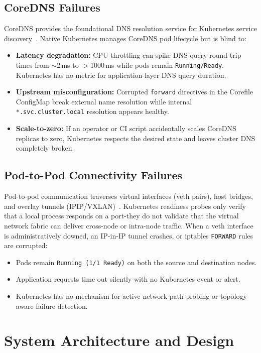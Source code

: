 \documentclass[conference]{IEEEtran}
\begin{document}
\subsection{CoreDNS Failures}
CoreDNS provides the foundational DNS resolution service for Kubernetes service discovery~\cite{coredns-docs}. Native Kubernetes manages CoreDNS pod lifecycle but is blind to:
\begin{itemize}
  \item \textbf{Latency degradation:} CPU throttling can spike DNS query round-trip times from $\sim$2\,ms to $>$1000\,ms while pods remain \texttt{Running/Ready}. Kubernetes has no metric for application-layer DNS query duration.
  \item \textbf{Upstream misconfiguration:} Corrupted \texttt{forward} directives in the Corefile ConfigMap break external name resolution while internal \texttt{*.svc.cluster.local} resolution appears healthy.
  \item \textbf{Scale-to-zero:} If an operator or CI script accidentally scales CoreDNS replicas to zero, Kubernetes respects the desired state and leaves cluster DNS completely broken.
\end{itemize}

\subsection{Pod-to-Pod Connectivity Failures}
Pod-to-pod communication traverses virtual interfaces (veth pairs), host bridges, and overlay tunnels (IPIP/VXLAN)~\cite{calico-docs}. Kubernetes readiness probes only verify that a local process responds on a port-they do not validate that the virtual network fabric can deliver cross-node or intra-node traffic. When a veth interface is administratively downed, an IP-in-IP tunnel crashes, or iptables \texttt{FORWARD} rules are corrupted:
\begin{itemize}
  \item Pods remain \texttt{Running (1/1 Ready)} on both the source and destination nodes.
  \item Application requests time out silently with no Kubernetes event or alert.
  \item Kubernetes has no mechanism for active network path probing or topology-aware failure detection.
\end{itemize}

\section{System Architecture and Design}
\end{document}
